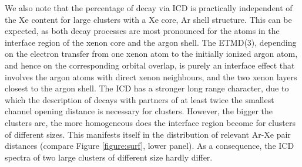 We also note that the percentage of decay via ICD is practically
independent of the Xe content for large clusters with a Xe core, Ar shell structure.
This can be expected, as both decay processes are most pronounced for the
atoms in the interface region of the xenon core and the argon shell.
The ETMD(3), depending on the electron transfer from one xenon atom to the
initially ionized argon atom, and hence on the corresponding orbital overlap,
is purely an interface effect that involves the argon atoms with direct xenon
neighbours, and the two xenon layers closest to the argon shell.
The ICD has a stronger long range character, due to which the description
of decays with partners of at least twice the smallest channel opening
distance is necessary for clusters. However, the bigger the clusters are,
the more homogeneous does the interface region become for clusters of
different sizes. This manifests itself in the distribution of relevant
Ar-Xe pair distances (compare Figure \ref{figure:surf}, lower panel).
As a consequence, the ICD spectra of two large clusters of different size
hardly differ.

\clearpage
